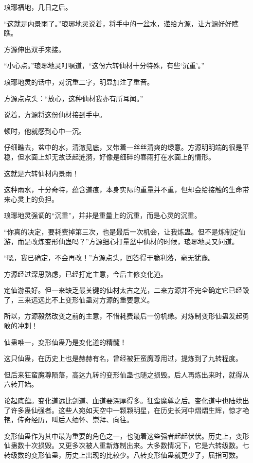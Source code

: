 
\begin{this_body}

琅琊福地，几日之后。

“这就是内景雨了。”琅琊地灵说着，将手中的一盆水，递给方源，让方源好好瞧瞧。

方源伸出双手来接。

“小心点。”琅琊地灵叮嘱道，“这份六转仙材十分特殊，有些‘沉重’。”

琅琊地灵的话中，对沉重二字，明显加注了重音。

方源点点头：“放心，这种仙材我亦有所耳闻。”

说着，方源将这份仙材接到手中。

顿时，他就感到心中一沉。

仔细瞧去，盆中的水，清澈见底，又带着一丝丝清爽的绿意。方源明明端的很是平稳，但水面上却无故泛起涟漪，好像是细碎的春雨打在水面上的情形。

这就是六转仙材内景雨！

这种雨水，十分奇特，蕴含道痕，本身实际的重量并不重，但却会给接触的生命带来心灵上的负担。

琅琊地灵强调的“沉重”，并非是重量上的沉重，而是心灵的沉重。

“你真的决定，要耗费掉第三次，也是最后一次机会，让我炼蛊。但不是炼制定仙游，而是改炼变形仙蛊吗？”方源细心打量盆中仙材的时候，琅琊地灵又问道。

“嗯，我已确定，不会再改！”方源点头，回答得干脆利落，毫无犹豫。

方源经过深思熟虑，已经打定主意，今后主修变化道。

定仙游虽好。但一来缺乏最关键的仙材太古之光，二来方源并不完全确定它已经毁了，三来远远比不上变形仙蛊对方源的重要意义。

所以，方源毅然改变之前的主意，不惜耗费最后一份机缘。对炼制变形仙蛊发起勇敢的冲刺！

仙蛊唯一，变形仙蛊乃是变化道的精髓！

这只仙蛊，在历史上也是赫赫有名，曾经被狂蛮魔尊用过，提炼到了九转程度。

但后来狂蛮魔尊陨落，高达九转的变形仙蛊也随之损毁。后人再炼出来时，就得从六转开始。

论起底蕴。变化道远比剑道、血道要深厚得多。狂蛮魔尊之后。变化道中也陆续出了许多蛊仙强者。这些人宛如天空中一颗颗明星，在历史长河中熠熠生辉，惊才艳艳，传奇经历，叫后人缅怀、崇拜、向往。

变形仙蛊作为其中最为重要的角色之一，也随着这些强者起起伏伏。历史上，变形仙蛊数十次损毁。又更多次被人重新炼制出来。大多数情况下，它是六转级数。七转级数的变形仙蛊，历史上出现的比较少。八转变形仙蛊就更少了，屈指可数。


\end{this_body}
